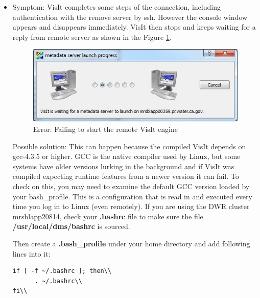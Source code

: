 \documentclass[12pt]{report}
\begin{document}
   \begin{itemize}

    \item Symptom: VisIt completes some steps of the connection, including authentication with the remove server by ssh. However the console window appears and disappears immediately. VisIt then stops and keeps waiting for a reply from remote server as shown in the Figure \ref{figure:failToStart}.

        \begin{figure}
        \begin{center}
        \includegraphics{failToStart}
        \caption{Error: Failing to start the remote VisIt engine}
        \label{figure:failToStart}
        \end{center}
        \end{figure}

Possible solution: This can happen because the compiled VisIt depends on gcc-4.3.5 or higher. GCC is the native compiler 
used by Linux, but some systems have older versions lurking in the background and if VisIt was compiled expecting runtime
features from a newer version it can fail. To check on this, you may need to examine the default GCC version loaded by your
bash\_profile. This is a configuration that is read in and executed every time you log in to Linux (even remotely). 
If you are using the DWR cluster mrsblapp20814, check your {\bf .bashrc} file to make sure the file {\bf /usr/local/dms/bashrc} is sourced. 

Then create a {\bf .bash\_profile} under your home directory and add following lines into it:\\

\begin{verbatim}
if [ -f ~/.bashrc ]; then\\
      . ~/.bashrc\\
fi\\
\end{verbatim} 
\end{itemize}
\end{document}
